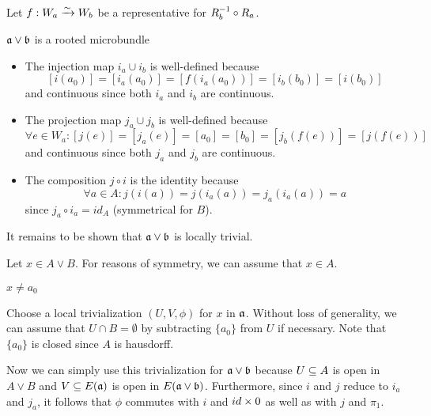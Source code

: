 \begin{myproof}
    Let $f: W_a \xrightarrow{\sim} W_b$ be a representative for $R_b^{-1} \circ R_a$.

    \begin{sectionize}
        \item $\ba \vee \bb$ is a rooted microbundle
        \begin{itemize}
            \item The injection map $i_a \cup i_b$ is well-defined because 
            \[ [i(a_0)] = [i_a(a_0)] = [f(i_a(a_0))] = [i_b(b_0)] = [i(b_0)] \]
            and continuous since both $i_a$ and $i_b$ are continuous.
            \item The projection map $j_a \cup j_b$ is well-defined because
            \[ \forall e \in W_a: [j(e)] = [j_a(e)] = [a_0] = [b_0] = [j_b(f(e))] = [j(f(e))] \]
            and continuous since both $j_a$ and $j_b$ are continuous.
            \item The composition $j \circ i$ is the identity because
            \[ \forall a \in A: j(i(a)) = j(i_a(a)) = j_a(i_a(a)) = a \]
            since $j_a \circ i_a = id_A$ (symmetrical for $B$).
        \end{itemize}
        It remains to be shown that $\ba \vee \bb$ is locally trivial.

        Let $x \in A \vee B$.
        For reasons of symmetry, we can assume that $x \in A$.
        \begin{caselist}
            \item $x \neq a_0$
            
            Choose a local trivialization $(U, V, \phi)$ for $x$ in $\mathfrak{a}$.
            Without loss of generality,
            we can assume that $U \cap B = \emptyset$ by subtracting
            $\{a_0\}$ from $U$ if necessary.
            Note that $\{a_0\}$ is closed since $A$ is hausdorff.
            
            Now we can simply use this trivialization for $\ba \vee \bb$ because
            $U \subseteq{} A$ is open in $A \vee B$ and
            $V \subseteq{} E(\mathfrak{a})$ is open in $E(\ba \vee \bb)$.
            Furthermore, since $i$ and $j$ reduce to $i_a$ and $j_a$,
            it follows that $\phi$ commutes with $i$ and $id \times 0$
            as well as with $j$ and $\pi_1$.


\end{caselist}
\end{sectionize}
\end{myproof}
